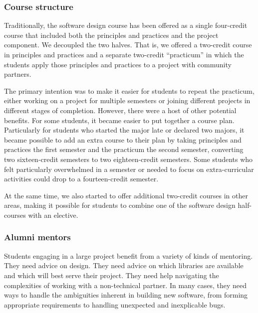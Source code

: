 \subsubsection{Course structure}

Traditionally, the software design course has been offered as a single
four-credit course that included both the principles and practices and
the project component.  We decoupled the two halves.  That is, we 
offered a two-credit course in principles and practices and
a separate two-credit ``practicum'' in which the students apply
those principles and practices to a project with community partners.

The primary intention was to make it easier for students to repeat
the practicum, either working on a project for multiple semesters
or joining different projects in different stages of completion.
However, there were a host of other potential benefits.  For some
students, it became easier to put together a course plan. Particularly
for students who started the major late or declared two
majors, it became possible to add an extra course to their plan by
taking principles and practices the first semester and
the practicum the second semester,
converting two sixteen-credit semesters to two eighteen-credit
semesters. 
Some students who felt particularly
overwhelmed in a semester or needed to focus on extra-curricular activities
could drop to a fourteen-credit semester.

At the same time, we also started to offer additional two-credit
courses in other areas, making it possible for students to combine
one of the software design half-courses with an elective.

\subsubsection{Alumni mentors}

Students engaging in a large project benefit from a variety of kinds
of mentoring.  They need advice on design.  They need advice on
which libraries are available and which will best serve their
project.  They need help navigating the complexities of working
with a non-technical partner.  In many cases, they need ways to
handle the ambiguities inherent in building new software, from
forming appropriate requirements to handling unexpected and
inexplicable bugs.

